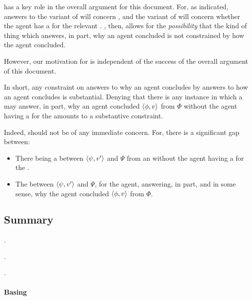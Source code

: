 \begin{note}
  \supportII{} has a key role in the overall argument for this document.
  For, as indicated, answers to the variant of \qWhy{} will concern \ros{}, and the variant of \qHow{} will concern whether the agent has a \wit{} for the relevant \ros{}.
  \supportII{}, then, allows for the \emph{possibility} that the kind of thing which answers, in part, why an agent concluded is not constrained by how the agent concluded.

  However, our motivation for \supportII{} is independent of the success of the overall argument of this document.

  In short, any constraint on answers to why an agent concludes by answers to how an agent concludes is substantial.
  Denying that there is any instance in which a \ros{} may answer, in part, why an agent concluded \(\langle \phi, v \rangle\) from \(\Phi\) without the agent having a \wit{} for the \ros{} amounts to a substantive constraint.

  Indeed, \supportII{} should not be of any immediate concern.
  For, there is a significant gap between:

  \begin{itemize}[noitemsep]
  \item
    There being a \ros{} between \(\langle \psi, v' \rangle\) and \(\Psi\) from an \agpe{} without the agent having a \wit{} for the \ros{}.
  \item
    The \ros{} between \(\langle \psi, v' \rangle\) and \(\Psi\), for the agent, answering, in part, and in some sense, why the agent concluded \(\langle \phi, v \rangle\) from \(\Phi\).
  \end{itemize}
\end{note}

\subsection{Summary}
\label{cha:var:ros:summary}

\begin{note}
  \supportI{}.

  .

  \supportII{}.
\end{note}

\paragraph{Basing}

